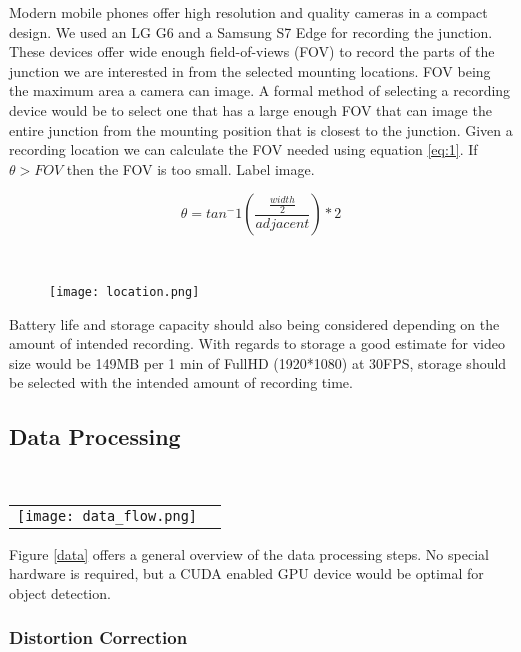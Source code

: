 Modern mobile phones offer high resolution and quality cameras in a compact design. We used an LG G6 and a Samsung S7 Edge for recording the junction.
These devices offer wide enough field-of-views (FOV) to record the parts of the junction we are interested in from the selected mounting locations.
FOV being the maximum area a camera can image. A formal method of selecting a recording device would be to select one that has a large enough FOV that can image the entire junction 
from the mounting position that is closest to the junction. Given a recording location we can calculate the FOV needed using equation \ref{eq:1}.
If $\theta > FOV$ then the FOV is too small. Label image.

\begin{equation}
    \theta = tan^-1(\frac{\frac{width}{2}}{adjacent}) * 2\label{eq:1}
  \end{equation}

\ \\ 
  \begin{figure}[h]
    \texttt{[image: location.png]}
    \centering 
    \end{figure}
    \label{Camera location}

Battery life and storage capacity should also being considered depending on the amount of intended recording. 
With regards to storage a good estimate for video size would be 149MB per 1 min of FullHD (1920*1080) at 30FPS, storage should be selected
with the intended amount of recording time.

\subsection{Data Processing}

\ \\ 
\noindent
\begin{tabular}{@{}cc}
\texttt{[image: data\_flow.png]} 
\end{tabular}
\label{data}


Figure \ref{data} offers a general overview of the data processing steps. No special hardware is required, but a CUDA enabled GPU
device would be optimal for object detection.
\ \\
\subsubsection{Distortion Correction}

